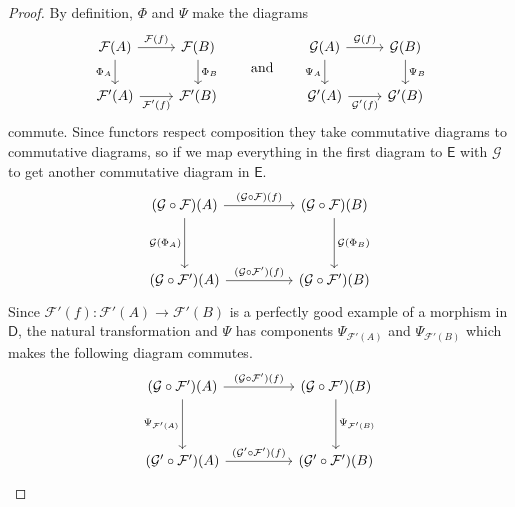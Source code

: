 \documentclass[main.tex]{subfiles}
\begin{document}
\begin{proof}
  By definition, $\Phi$ and $\Psi$ make the diagrams
  \begin{equation*}
    \begin{tikzcd}
      \mathcal{F}(A)
      \arrow[d, swap, "\Phi_{A}"]
      \arrow[r, "\mathcal{F}(f)"]
      & \mathcal{F}(B)
      \arrow[d, "\Phi_{B}"]
      \\
      \mathcal{F}'(A)
      \arrow[r, swap, "\mathcal{F}'(f)"]
      & \mathcal{F}'(B)
    \end{tikzcd}
    \qquad\text{and}\qquad
    \begin{tikzcd}
      \mathcal{G}(A)
      \arrow[d, swap, "\Psi_{A}"]
      \arrow[r, "\mathcal{G}(f)"]
      & \mathcal{G}(B)
      \arrow[d, "\Psi_{B}"]
      \\
      \mathcal{G}'(A)
      \arrow[r, swap, "\mathcal{G}'(f)"]
      & \mathcal{G}'(B)
    \end{tikzcd}
  \end{equation*}
  commute. Since functors respect composition they take commutative diagrams to commutative diagrams, so if we map everything in the first diagram to $\mathsf{E}$ with $\mathcal{G}$ to get another commutative diagram in $\mathsf{E}$.
  \begin{equation*}
    \begin{tikzcd}[row sep=huge, column sep=huge]
      (\mathcal{G} \circ \mathcal{F})(A)
      \arrow[d, swap, "\mathcal{G}(\Phi_{A})"]
      \arrow[r, "(\mathcal{G} \circ \mathcal{F})(f)"]
      & (\mathcal{G} \circ \mathcal{F})(B)
      \arrow[d, "\mathcal{G}(\Phi_{B})"]
      \\
      (\mathcal{G} \circ \mathcal{F}')(A)
      \arrow[r, "(\mathcal{G} \circ \mathcal{F}')(f)"]
      & (\mathcal{G} \circ \mathcal{F}')(B)
    \end{tikzcd}
  \end{equation*}
  Since $\mathcal{F}'(f)\colon \mathcal{F}'(A) \to \mathcal{F}'(B)$ is a perfectly good example of a morphism in $\mathsf{D}$, the natural transformation and $\Psi$ has components $\Psi_{\mathcal{F}'(A)}$ and $\Psi_{\mathcal{F}'(B)}$ which makes the following diagram commutes.
  \begin{equation*}
    \begin{tikzcd}[row sep=huge, column sep=huge]
      (\mathcal{G} \circ \mathcal{F}')(A)
      \arrow[r, "(\mathcal{G} \circ \mathcal{F}')(f)"]
      \arrow[d, swap, "\Psi_{\mathcal{F}'(A)}"]
      & (\mathcal{G} \circ \mathcal{F}')(B)
      \arrow[d, "\Psi_{\mathcal{F}'(B)}"]
      \\
      (\mathcal{G}' \circ \mathcal{F}')(A)
      \arrow[r, "(\mathcal{G}' \circ \mathcal{F}')(f)"]
      & (\mathcal{G}' \circ \mathcal{F}')(B)
    \end{tikzcd}
  \end{equation*}


\end{proof}
\end{document}
